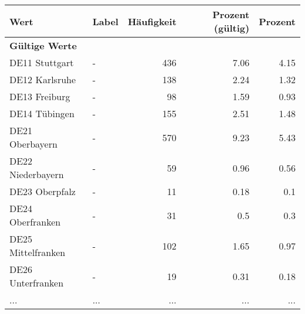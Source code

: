      \begin{longtable}{Xlrrr}
     \toprule
     \textbf{Wert} & \textbf{Label} & \textbf{Häufigkeit} & \textbf{Prozent (gültig)} & \textbf{Prozent} \\
     \endhead
     \midrule
     \multicolumn{5}{l}{\textbf{Gültige Werte}}\\
        \multicolumn{1}{X}{DE11 Stuttgart} & - & \num{436} & \num[round-mode=places,round-precision=2]{7.06} & \num[round-mode=places,round-precision=2]{4.15} \\
        \multicolumn{1}{X}{DE12 Karlsruhe} & - & \num{138} & \num[round-mode=places,round-precision=2]{2.24} & \num[round-mode=places,round-precision=2]{1.32} \\
        \multicolumn{1}{X}{DE13 Freiburg} & - & \num{98} & \num[round-mode=places,round-precision=2]{1.59} & \num[round-mode=places,round-precision=2]{0.93} \\
        \multicolumn{1}{X}{DE14 Tübingen} & - & \num{155} & \num[round-mode=places,round-precision=2]{2.51} & \num[round-mode=places,round-precision=2]{1.48} \\
        \multicolumn{1}{X}{DE21 Oberbayern} & - & \num{570} & \num[round-mode=places,round-precision=2]{9.23} & \num[round-mode=places,round-precision=2]{5.43} \\
        \multicolumn{1}{X}{DE22 Niederbayern} & - & \num{59} & \num[round-mode=places,round-precision=2]{0.96} & \num[round-mode=places,round-precision=2]{0.56} \\
        \multicolumn{1}{X}{DE23 Oberpfalz} & - & \num{11} & \num[round-mode=places,round-precision=2]{0.18} & \num[round-mode=places,round-precision=2]{0.1} \\
        \multicolumn{1}{X}{DE24 Oberfranken} & - & \num{31} & \num[round-mode=places,round-precision=2]{0.5} & \num[round-mode=places,round-precision=2]{0.3} \\
        \multicolumn{1}{X}{DE25 Mittelfranken} & - & \num{102} & \num[round-mode=places,round-precision=2]{1.65} & \num[round-mode=places,round-precision=2]{0.97} \\
        \multicolumn{1}{X}{DE26 Unterfranken} & - & \num{19} & \num[round-mode=places,round-precision=2]{0.31} & \num[round-mode=places,round-precision=2]{0.18} \\
       ... & ... & ... & ... & ... \\

\end{longtable}
